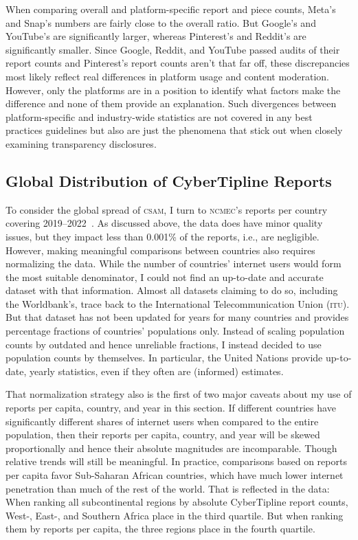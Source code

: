 \documentclass[nonacm,screen]{acmart}
\newcommand\V[1]{\textsc{\MakeLowercase{#1}}}
\begin{document}
When comparing overall and platform-specific report and piece counts, Meta's and
Snap's numbers are fairly close to the overall ratio. But Google's and YouTube's
are significantly larger, whereas Pinterest's and Reddit's are significantly
smaller. Since Google, Reddit, and YouTube passed audits of their report counts
and Pinterest's report counts aren't that far off, these discrepancies most
likely reflect real differences in platform usage and content moderation.
However, only the platforms are in a position to identify what factors make the
difference and none of them provide an explanation. Such divergences between
platform-specific and industry-wide statistics are not covered in any best
practices guidelines but also are just the phenomena that stick out when closely
examining transparency disclosures.


\subsection{Global Distribution of CyberTipline Reports}
\label{sec:spread}

To consider the global spread of \V{CSAM}, I turn to \V{NCMEC}'s reports per
country covering 2019--2022~\cite{NcmecByCountry2019,NcmecByCountry2020,
NcmecByCountry2021,NcmecByCountry2020}. As discussed above, the data does have
minor quality issues, but they impact less than 0.001\% of the reports, i.e.,
are negligible. However, making meaningful comparisons between countries also
requires normalizing the data. While the number of countries' internet users
would form the most suitable denominator, I could not find an up-to-date and
accurate dataset with that information. Almost all datasets claiming to do so,
including the Worldbank's, trace back to the International Telecommunication
Union (\V{ITU}). But that dataset has not been updated for years for many
countries and provides percentage fractions of countries' populations only.
Instead of scaling population counts by outdated and hence unreliable fractions,
I instead decided to use population counts by themselves. In particular, the
United Nations provide up-to-date, yearly statistics, even if they often are
(informed) estimates.

That normalization strategy also is the first of two major caveats about my use
of reports per capita, country, and year in this section. If different countries
have significantly different shares of internet users when compared to the
entire population, then their reports per capita, country, and year will be
skewed proportionally and hence their absolute magnitudes are incomparable.
Though relative trends will still be meaningful. In practice, comparisons based
on reports per capita favor Sub-Saharan African countries, which have much lower
internet penetration than much of the rest of the world. That is reflected in
the data: When ranking all subcontinental regions by absolute CyberTipline
report counts, West-, East-, and Southern Africa place in the third quartile.
But when ranking them by reports per capita, the three regions place in the
fourth quartile.
\end{document}
